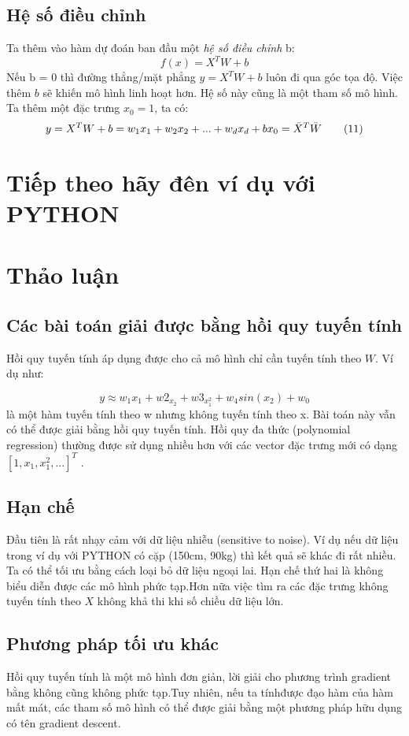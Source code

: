 \documentclass{article}
\begin{document}
\subsection{Hệ số điều chỉnh}
Ta thêm vào hàm dự đoán ban đầu một \textit{hệ số điều chỉnh} b:
\begin{equation}
    f(x) = X^TW + b \tag{10}
\end{equation}
Nếu b = 0 thì đường thẳng/mặt phẳng $y = X^TW + b$ luôn đi qua góc tọa độ. Việc thêm $b$ sẽ khiến mô hình linh hoạt hơn. Hệ số này cũng là một tham số mô hình.
Ta thêm một đặc trưng $x_0 = 1$, ta có:
\begin{equation}
    y = X^TW + b = w_1x_1 + w_2x_2 + ... + w_dx_d + bx_0 = \Bar{X}^T\Bar{W} \tag{11}
\end{equation}
\section{Tiếp theo hãy đên ví dụ với PYTHON}
\section{Thảo luận}
\subsection{Các bài toán giải được bằng hồi quy tuyến tính}
Hồi quy tuyến tính áp dụng được cho cả mô hình chỉ cần tuyến tính theo $W$. Ví dụ như:

\begin{equation}
     y \approx w_1x_1 + w2_x_2 + w3_x_1^2 + w_4sin(x_2) + w_0 \tag{13}
\end{equation}
là một hàm tuyến tính theo w nhưng không tuyến tính theo x. Bài toán này vẫn có thể được giải bằng hồi quy tuyến tính. Hồi quy đa thức (polynomial regression) thường được sử dụng nhiều hơn với các vector đặc trưng mới có dạng $[1, x_1, x_1^2,...]^T$ . 

\subsection{Hạn chế}
Đầu tiên là rất nhạy cảm với dữ liệu nhiễu (sensitive to noise).  Ví dụ nếu dữ liệu trong ví dụ với PYTHON có cặp (150cm, 90kg) thì kết quả sẽ khác đi rất nhiều. Ta có thể tối ưu bằng cách loại bỏ dữ liệu ngoại lai.
Hạn chế thứ hai là không biểu diễn được các mô hình phức tạp.Hơn nữa việc tìm ra các đặc trưng không tuyến tính theo $X$ không khả thi khi số chiều dữ liệu lớn.

\subsection{Phương pháp tối ưu khác}
Hồi quy tuyến tính là một mô hình đơn giản, lời giải cho phương trình gradient
bằng không cũng không phức tạp.Tuy nhiên, nếu ta tínhđược đạo hàm của hàm mất mát, các tham số mô hình có thể được giải bằng một phương pháp hữu dụng có tên gradient descent.
\end{document}

